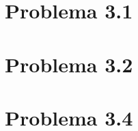 \section{Problema 3.1}  \label{problema3_1}

\newpage

\section{Problema 3.2}  \label{problema3_2}

\newpage

%

\section{Problema 3.4}  \label{problema3_4}
